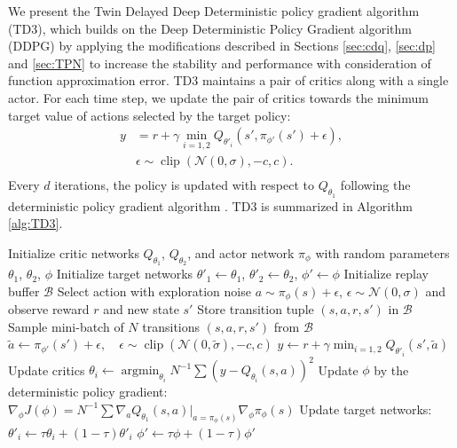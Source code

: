 \documentclass{article}
\newcommand{\e}{\epsilon}
\newcommand{\y}{\gamma}
\newcommand{\s}{\sigma}
\newcommand{\N}{\mathcal{N}}
\newcommand{\B}{\mathcal{B}}
\DeclareMathOperator*{\argmin}{argmin}
\DeclareMathOperator*{\clip}{clip}
\begin{document}
We present the Twin Delayed Deep Deterministic policy gradient algorithm (TD3), which builds on the Deep Deterministic Policy Gradient algorithm (DDPG) \cite{DDPG} by applying the modifications described in Sections \ref{sec:cdq}, \ref{sec:dp} and \ref{sec:TPN} to increase the stability and performance with consideration of function approximation error. 
TD3 maintains a pair of critics along with a single actor. For each time step, we update the pair of critics towards the minimum target value of actions selected by the target policy:
\begin{equation}
\begin{aligned}
y &= r + \y \min_{i=1,2} Q_{\theta'_i}(s', \pi_{\phi'}(s') + \e), \\
& \e \sim \clip(\N(0, \s), -c, c). \\
\end{aligned}
\end{equation}
Every $d$ iterations, the policy is updated with respect to $ Q_{\theta_1}$ following the deterministic policy gradient algorithm \cite{DPG}. TD3 is summarized in Algorithm \ref{alg:TD3}.

\begin{algorithm}[tb]
   \caption{TD3}
   \label{alg:TD3}
\begin{algorithmic}
   \STATE Initialize critic networks $Q_{\theta_1}$, $Q_{\theta_2}$, and actor network $\pi_\phi$ with random parameters $\theta_1$, $\theta_2$, $\phi$
   \STATE Initialize target networks $\theta'_1 \leftarrow \theta_1$, $\theta'_2 \leftarrow \theta_2$, $\phi' \leftarrow \phi$
   \STATE Initialize replay buffer $\B$
   \STATE Select action with exploration noise $a \sim \pi_\phi(s) + \e$, 
   \STATE $\e \sim \N(0, \sigma)$ and observe reward $r$ and new state $s'$
   \STATE Store transition tuple $(s, a, r, s')$ in $\B$ 
   \STATE 
   \STATE Sample mini-batch of $N$ transitions $(s, a, r, s')$ from $\B$
   \STATE $\tilde a \leftarrow \pi_{\phi'}(s') + \e, \quad \e \sim \clip(\N(0, \tilde \s), -c, c)$
   \STATE $y \leftarrow r + \y \min_{i=1,2} Q_{\theta'_i}(s', \tilde a)$
   \STATE Update critics $\theta_i \leftarrow \argmin_{\theta_i} N^{-1} \sum (y - Q_{\theta_i}(s,a))^2$
   \STATE Update $\phi$ by the deterministic policy gradient:
   \STATE $\nabla_{\phi} J(\phi) = N^{-1} \sum \nabla_{a} Q_{\theta_1}(s, a) |_{a=\pi_{\phi}(s)} \nabla_{\phi} \pi_\phi(s)$
   \STATE Update target networks:
   \STATE $\theta'_i \leftarrow \tau \theta_i + (1 - \tau) \theta'_i$
   \STATE $\phi' \leftarrow \tau \phi + (1 - \tau) \phi'$
   \ENDIF
   \ENDFOR
\end{algorithmic}
\end{algorithm}
\end{document}
